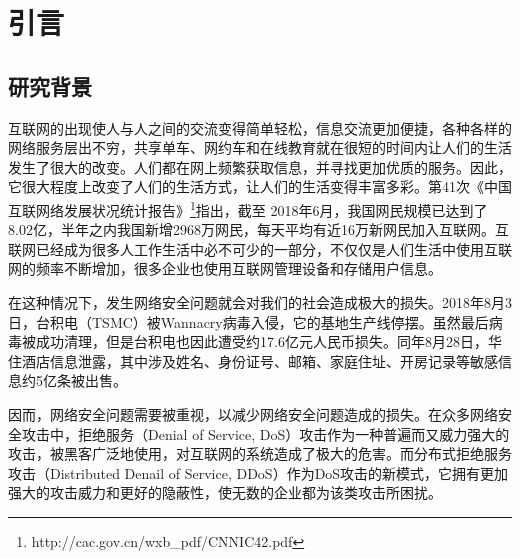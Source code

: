 \chapter{引言}
\label{cha:intro}

\section{研究背景}
\label{sec:background}

互联网的出现使人与人之间的交流变得简单轻松，信息交流更加便捷，各种各样的网络服务层出不穷，共享单车、网约车和在线教育就在很短的时间内让人们的生活发生了很大的改变。人们都在网上频繁获取信息，并寻找更加优质的服务。因此，它很大程度上改变了人们的生活方式，让人们的生活变得丰富多彩。第41次《中国互联网络发展状况统计报告》\footnote{http://cac.gov.cn/wxb\_pdf/CNNIC42.pdf}指出，截至 2018年6月，我国网民规模已达到了8.02亿，半年之内我国新增2968万网民，每天平均有近16万新网民加入互联网。互联网已经成为很多人工作生活中必不可少的一部分，不仅仅是人们生活中使用互联网的频率不断增加，很多企业也使用互联网管理设备和存储用户信息。

在这种情况下，发生网络安全问题就会对我们的社会造成极大的损失。2018年8月3日，台积电（TSMC）被Wannacry病毒入侵，它的基地生产线停摆。虽然最后病毒被成功清理，但是台积电也因此遭受约17.6亿元人民币损失。同年8月28日，华住酒店信息泄露，其中涉及姓名、身份证号、邮箱、家庭住址、开房记录等敏感信息约5亿条被出售。

因而，网络安全问题需要被重视，以减少网络安全问题造成的损失。在众多网络安全攻击中，拒绝服务（Denial of Service, DoS）攻击作为一种普遍而又威力强大的攻击，被黑客广泛地使用，对互联网的系统造成了极大的危害。而分布式拒绝服务攻击（Distributed Denail of Service, DDoS）作为DoS攻击的新模式，它拥有更加强大的攻击威力和更好的隐蔽性，使无数的企业都为该类攻击所困扰。


